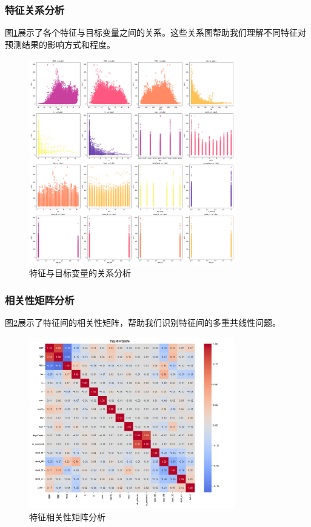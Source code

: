 \subsubsection{特征关系分析}
图\ref{fig:reg_feat_rel}展示了各个特征与目标变量之间的关系。这些关系图帮助我们理解不同特征对预测结果的影响方式和程度。

\begin{figure}[H]
    \centering
    \includegraphics[width=0.8\textwidth]{images/regression/feature_relationships}
    \caption{特征与目标变量的关系分析}
    \label{fig:reg_feat_rel}
\end{figure}

\subsubsection{相关性矩阵分析}
图\ref{fig:reg_corr}展示了特征间的相关性矩阵，帮助我们识别特征间的多重共线性问题。

\begin{figure}[H]
    \centering
    \includegraphics[width=0.8\textwidth]{images/regression/correlation_matrix}
    \caption{特征相关性矩阵分析}
    \label{fig:reg_corr}
\end{figure}


